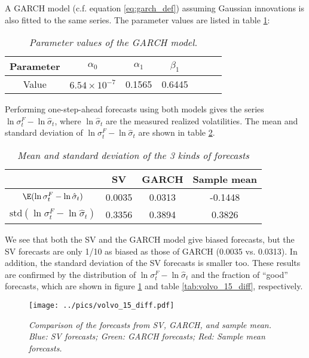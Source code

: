 A GARCH model (c.f. equation \ref{eq:garch_def}) assuming Gaussian
innovations is also fitted to the same series. The parameter values
are listed in table \ref{tab:volvo_15_garch_param}:
\begin{table}[htb!]
  \centering
  \begin{tabular}{|c|c|c|c|c|c|c|}
  \hline
  Parameter & $\alpha_0$ & $\alpha_1$ & $\beta_{1}$ \\
  \hline
  Value & $6.54 \times 10^{-7}$ & 0.1565 & 0.6445\\
  \hline
  \end{tabular}
  \caption{\small \it Parameter values of the GARCH model.}
  \label{tab:volvo_15_garch_param}
\end{table}

Performing one-step-ahead forecasts using both models gives the series
$\ln\sigma^F_t - \ln\hat{\sigma}_t$, where $\ln\hat{\sigma}_t$ are the
measured realized volatilities. The mean and standard deviation of
$\ln\sigma^F_t - \ln\hat{\sigma}_t$ are shown in table
\ref{tab:volvo_15_stat}.
\begin{table}[htb!]
  \centering
  \begin{tabular}{|c|c|c|c|}
    \hline
     & SV & GARCH & Sample mean \\
     \hline
    $\E(\ln \sigma^F_t - \ln \hat{\sigma}_t)$ & 0.0035 & 0.0313 & -0.1448 \\
    \hline
     $\text{std}(\ln \sigma^F_t - \ln \hat{\sigma}_t)$ & 0.3356 &
     0.3894 & 0.3826 \\
    \hline
 \end{tabular}
  \caption{\small \it Mean and standard deviation of the 3 kinds of
    forecasts}
  \label{tab:volvo_15_stat}
\end{table}
We see that both the SV and the GARCH model give biased forecasts, but
the SV forecasts are only 1/10 as biased as those of GARCH (0.0035
vs. 0.0313). In addition, the standard deviation of the SV forecasts
is smaller too. These results are confirmed by the distribution of
$\ln \sigma^F_t - \ln \hat{\sigma}_t$ and the fraction of ``good''
forecasts, which are shown in figure \ref{fig:volvo_15_diff} and table
\ref{tab:volvo_15_diff}, respectively.
\begin{figure}[htb!]
  \centering
    \texttt{[image: ../pics/volvo\_15\_diff.pdf]}
  \caption{\small \it Comparison of the forecasts from SV, GARCH,
    and sample mean. Blue: SV forecasts; Green: GARCH forecasts; Red:
    Sample mean forecasts.}
  \label{fig:volvo_15_diff}
\end{figure}
